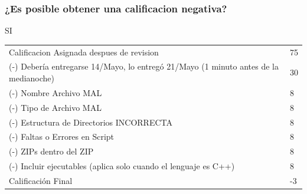 \begin{frame}
\frametitle{¿Es posible obtener una calificacion negativa?}
SI
\begin{center}
\begin{tabular}{p{8cm}|p{5cm}}
\hline
Calificacion Asignada despues de revision & 75 \\
(-) Debería entregarse 14/Mayo, lo entregó 21/Mayo (1 minuto antes de la medianoche) & 30 \\
(-) Nombre Archivo MAL & 8 \\ 
(-) Tipo de Archivo MAL & 8 \\ 
(-) Estructura de Directorios INCORRECTA & 8 \\ 
(-) Faltas o Errores en Script  & 8 \\ 
(-) ZIPs dentro del ZIP  & 8 \\ 
(-) Incluir ejecutables (aplica solo cuando el lenguaje es C++)  & 8 \\
Calificación Final  & -3 \\
\hline
\hline
\end{tabular}


\end{center}


\end{frame}







